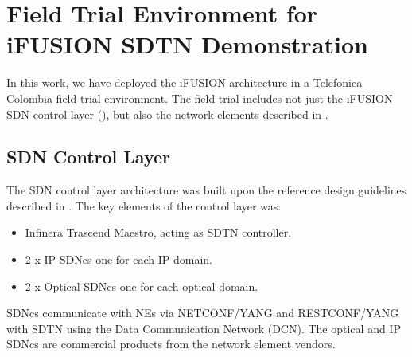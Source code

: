 \documentclass[10pt, conference]{IEEEtran}
\begin{document}



\section{Field Trial Environment for i\uppercase{FUSION} SDTN Demonstration}
\label{section:trial}

In this work, we have deployed the i\uppercase{Fusion} architecture in a Telefonica Colombia field trial environment. The field trial includes not just the i\uppercase{FUSION} SDN control layer (), but also the network elements described in .%

\subsection{SDN Control Layer}
\label{sec:contollay}
The SDN control layer architecture was built upon the reference design guidelines described in . The key elements of the control layer was:
\begin{itemize}
    \item Infinera Trascend Maestro, acting as SDTN controller.
    \item 2 x IP SDNcs one for each IP domain. 
    \item 2 x Optical SDNcs one for each optical domain.
\end{itemize}

SDNcs communicate with NEs via NETCONF/YANG and RESTCONF/YANG with SDTN using the Data Communication Network (DCN). The optical and IP SDNcs are commercial products from the network element vendors.  
\end{document}
